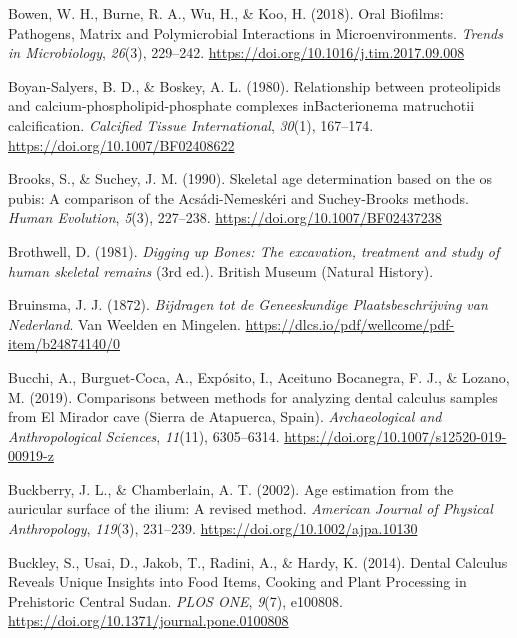 \documentclass[
  letterpaper,
]{book}
\newlength{\cslhangindent}
\newlength{\cslentryspacingunit} %
\newenvironment{CSLReferences}[2] %
 {%
  \setlength{\parindent}{0pt}
  \ifodd #1
  \let\oldpar\par
  \def\par{\hangindent=\cslhangindent\oldpar}
  \fi
  \setlength{\parskip}{#2\cslentryspacingunit}
 }%
 {}
\begin{document}
\begin{CSLReferences}{1}{0}
\leavevmode{}%
Bowen, W. H., Burne, R. A., Wu, H., \& Koo, H. (2018). Oral {Biofilms}:
{Pathogens}, {Matrix} and {Polymicrobial Interactions} in
{Microenvironments}. \emph{Trends in Microbiology}, \emph{26}(3),
229--242. \url{https://doi.org/10.1016/j.tim.2017.09.008}

\leavevmode{}%
Boyan-Salyers, B. D., \& Boskey, A. L. (1980). Relationship between
proteolipids and calcium-phospholipid-phosphate complexes
{inBacterionema} matruchotii calcification. \emph{Calcified Tissue
International}, \emph{30}(1), 167--174.
\url{https://doi.org/10.1007/BF02408622}

\leavevmode{}%
Brooks, S., \& Suchey, J. M. (1990). Skeletal age determination based on
the os pubis: {A} comparison of the {Acsádi-Nemeskéri} and
{Suchey-Brooks} methods. \emph{Human Evolution}, \emph{5}(3), 227--238.
\url{https://doi.org/10.1007/BF02437238}

\leavevmode{}%
Brothwell, D. (1981). \emph{Digging up {Bones}: {The} excavation,
treatment and study of human skeletal remains} (3rd ed.). {British
Museum (Natural History)}.

\leavevmode{}%
Bruinsma, J. J. (1872). \emph{Bijdragen tot de {Geneeskundige
Plaatsbeschrijving} van {Nederland}}. {Van Weelden en Mingelen}.
\url{https://dlcs.io/pdf/wellcome/pdf-item/b24874140/0}

\leavevmode{}%
Bucchi, A., Burguet-Coca, A., Expósito, I., Aceituno Bocanegra, F. J.,
\& Lozano, M. (2019). Comparisons between methods for analyzing dental
calculus samples from {El Mirador} cave ({Sierra} de {Atapuerca},
{Spain}). \emph{Archaeological and Anthropological Sciences},
\emph{11}(11), 6305--6314.
\url{https://doi.org/10.1007/s12520-019-00919-z}

\leavevmode{}%
Buckberry, J. L., \& Chamberlain, A. T. (2002). Age estimation from the
auricular surface of the ilium: A revised method. \emph{American Journal
of Physical Anthropology}, \emph{119}(3), 231--239.
\url{https://doi.org/10.1002/ajpa.10130}

\leavevmode{}%
Buckley, S., Usai, D., Jakob, T., Radini, A., \& Hardy, K. (2014).
Dental {Calculus Reveals Unique Insights} into {Food Items}, {Cooking}
and {Plant Processing} in {Prehistoric Central Sudan}. \emph{PLOS ONE},
\emph{9}(7), e100808. \url{https://doi.org/10.1371/journal.pone.0100808}


\end{CSLReferences}
\end{document}
